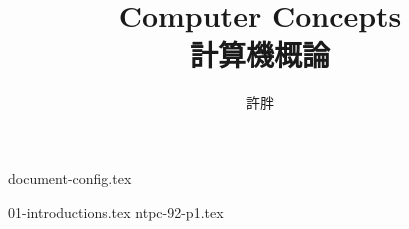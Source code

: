 \documentclass[12pt,a4paper,oneside]{book}
\begin{document}
\begin{CJK}{UTF8}{bkai}

{document-config.tex}

\title{Computer Concepts\\計算機概論}
\author{許胖}
\maketitle
\tableofcontents

{01-introductions.tex}
{ntpc-92-p1.tex}

\clearpage
\end{CJK}
\end{document}
